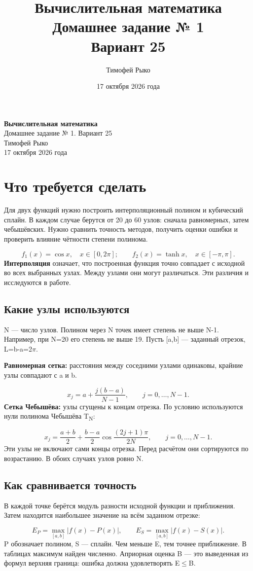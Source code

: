 \documentclass[12pt,a4paper]{article}
\title{\textbf{Вычислительная математика}\\[6pt]Домашнее задание № 1\\Вариант 25}
\author{Тимофей Рыко}
\date{17 октября 2026 года}
\begin{document}
\begin{center}
{\large\bfseries Вычислительная математика}\\[4pt]
{\large Домашнее задание № 1. Вариант 25}\\[6pt]
Тимофей Рыко\\[2pt]
17 октября 2026 года
\end{center}
\section{Что требуется сделать}
Для двух функций нужно построить интерполяционный полином и кубический сплайн. В каждом случае берутся от 20 до 60 узлов: сначала равномерных, затем чебышёвских. Нужно сравнить точность методов, получить оценки ошибки и проверить влияние чётности степени полинома.

\[
f_1(x)=\cos x,\quad x\in[0,2\pi];\qquad f_2(x)=\tanh x,\quad x\in[-\pi,\pi].
\]
\textbf{Интерполяция} означает, что построенная функция точно совпадает с исходной во всех выбранных узлах. Между узлами они могут различаться. Эти различия и исследуются в работе.

\subsection{Какие узлы используются}
N — число узлов. Полином через N точек имеет степень не выше N-1. Например, при N=20 его степень не выше 19. Пусть [a,b] — заданный отрезок, L=b-a=2\ensuremath{\pi}.

\textbf{Равномерная сетка:} расстояния между соседними узлами одинаковы, крайние узлы совпадают с a и b.

\[
x_j=a+\frac{j(b-a)}{N-1},\qquad j=0,\ldots,N-1.
\]
\textbf{Сетка Чебышёва:} узлы сгущены к концам отрезка. По условию используются нули полинома Чебышёва T\textsubscript{N}:

\[
x_j=\frac{a+b}{2}+\frac{b-a}{2}\cos\frac{(2j+1)\pi}{2N},\qquad j=0,\ldots,N-1.
\]
Эти узлы не включают сами концы отрезка. Перед расчётом они сортируются по возрастанию. В обоих случаях узлов ровно N.

\subsection{Как сравнивается точность}
В каждой точке берётся модуль разности исходной функции и приближения. Затем находится наибольшее значение на всём заданном отрезке:

\[
E_P=\max_{[a,b]}|f(x)-P(x)|,\qquad E_S=\max_{[a,b]}|f(x)-S(x)|.
\]
P обозначает полином, S — сплайн. Чем меньше E, тем точнее приближение. В таблицах максимум найден численно. Априорная оценка B — это выведенная из формул верхняя граница: ошибка должна удовлетворять E\ensuremath{\leq}B.
\end{document}
